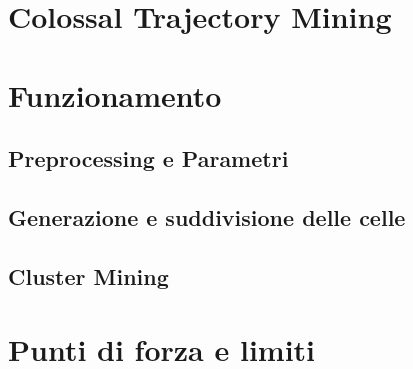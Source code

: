 

\section{Colossal Trajectory Mining}\label{sec:ctm-mining}


\section{Funzionamento}\label{sec:idea}

\subsection{Preprocessing e Parametri}\label{subsec:parameters}

\subsection{Generazione e suddivisione delle celle}\label{subsec:cells}

\subsection{Cluster Mining}\label{subsec:ctm}

\section{Punti di forza e limiti}\label{subsec:strenght}



